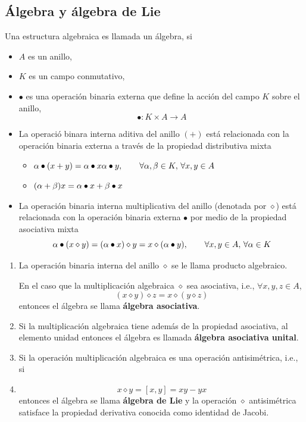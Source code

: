 \subsection{Álgebra y álgebra de Lie}
\begin{defi}
	Una estructura algebraica \algebra es llamada un álgebra, si
	\begin{itemize}
		\item $A$ es un anillo,
		\item $K$ es un campo conmutativo,
		\item $\bullet$ es una operación binaria externa que define la acción del campo $K$ sobre el anillo,
		\begin{equation}
  \bullet : K\times A\to A
\end{equation}
\item La operació binara interna aditiva del anillo $(+)$ está relacionada con la operación binaria externa a través de la propiedad distributiva mixta
\begin{itemize}
	\item $\alpha\bullet (x+y)=\alpha\bullet x\alpha\bullet y,\qquad \forall \alpha,\beta \in K,\, \forall x,y\in A$
	\item $(\alpha +\beta )x=\alpha\bullet x+\beta\bullet x$
\end{itemize}
\item La operación binaria interna multiplicativa del anillo (denotada por $\diamond$) está relacionada con la operación binaria externa $\bullet$ por medio de la propiedad asociativa mixta
\begin{equation}
  \alpha\bullet(x\diamond y)=(\alpha\bullet x)\diamond y=x\diamond (\alpha\bullet y),\qquad \forall x,y\in A,\, \forall \alpha\in K
\end{equation}
	\end{itemize}
\end{defi}
\begin{enumerate}
\item La operación binaria interna del anillo $\diamond$ se le llama producto algebraico.

En el caso que la multiplicación algebraica $\diamond$ sea asociativa, i.e., $\forall x,y,z\in A$,
\begin{equation}
  (x\diamond y)\diamond z=x\diamond (y\diamond z)
\end{equation}
entonces el álgebra se llama \textbf{álgebra asociativa}.

\item Si la multiplicación algebraica tiene además de la propiedad asociativa, al elemento unidad entonces el álgebra es llamada \textbf{álgebra asociativa unital}.
\item Si la operación multiplicación algebraica es una operación antisimétrica, i.e., si
\item \begin{equation}
  x\diamond y=[x,y]=xy-yx
\end{equation}
entonces el álgebra se llama \textbf{álgebra de Lie} y la operación $\diamond$ antisimétrica satisface la propiedad derivativa conocida como identidad de Jacobi.
\end{enumerate}

